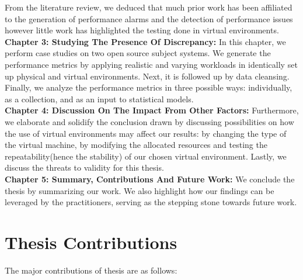 From the literature review, we deduced that much prior work has been affiliated to the generation of performance alarms and the detection of performance issues however little work has highlighted the testing done in virtual environments.
\\

\noindent\textbf{Chapter 3: Studying The Presence Of Discrepancy:} In this chapter, we perform case studies on two open source subject systems. We generate the performance metrics by applying realistic and varying workloads in identically set up physical and virtual environments. Next, it is followed up by data cleansing. Finally, we analyze the performance metrics in three possible ways: individually, as a collection, and as an input to statistical models. 
\\

\noindent\textbf{Chapter 4: Discussion On The Impact From Other Factors:}
Furthermore, we elaborate and solidify the conclusion drawn by discussing possibilities on how the use of virtual environments may affect our results: by changing the type of the virtual machine, by modifying the allocated resources and testing the repeatability(hence the stability) of our chosen virtual environment.
Lastly, we discuss the threats to validity for this thesis.
\\

\noindent\textbf{Chapter 5: Summary, Contributions And Future Work:}
We conclude the thesis by summarizing our work. We also highlight how our findings can be leveraged by the practitioners, serving as the stepping stone towards future work.  
\\



\section{Thesis Contributions}

The major contributions of thesis are as follows:

